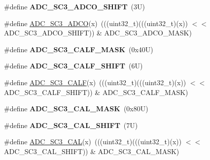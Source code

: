 \begin{DoxyCompactItemize}
\#define {\bfseries A\+D\+C\+\_\+\+S\+C3\+\_\+\+A\+D\+C\+O\+\_\+\+S\+H\+I\+FT}~(3\+U)
\item 
\#define \mbox{\hyperlink{group___a_d_c___register___masks_gaa0533bb7840bfc57b7f764013808b74d}{A\+D\+C\+\_\+\+S\+C3\+\_\+\+A\+D\+CO}}(x)~(((uint32\+\_\+t)(((uint32\+\_\+t)(x)) $<$$<$ A\+D\+C\+\_\+\+S\+C3\+\_\+\+A\+D\+C\+O\+\_\+\+S\+H\+I\+FT)) \& A\+D\+C\+\_\+\+S\+C3\+\_\+\+A\+D\+C\+O\+\_\+\+M\+A\+SK)
\item 
\mbox{\label{group___a_d_c___register___masks_ga3a706436447b6113727826e303c3fbe6}} 
\#define {\bfseries A\+D\+C\+\_\+\+S\+C3\+\_\+\+C\+A\+L\+F\+\_\+\+M\+A\+SK}~(0x40\+U)
\item 
\mbox{\label{group___a_d_c___register___masks_ga9fd60a35fc4c15b563078ecbd3eaa449}} 
\#define {\bfseries A\+D\+C\+\_\+\+S\+C3\+\_\+\+C\+A\+L\+F\+\_\+\+S\+H\+I\+FT}~(6\+U)
\item 
\#define \mbox{\hyperlink{group___a_d_c___register___masks_ga671f5531ad1accd17cbea2f319523a2d}{A\+D\+C\+\_\+\+S\+C3\+\_\+\+C\+A\+LF}}(x)~(((uint32\+\_\+t)(((uint32\+\_\+t)(x)) $<$$<$ A\+D\+C\+\_\+\+S\+C3\+\_\+\+C\+A\+L\+F\+\_\+\+S\+H\+I\+FT)) \& A\+D\+C\+\_\+\+S\+C3\+\_\+\+C\+A\+L\+F\+\_\+\+M\+A\+SK)
\item 
\mbox{\label{group___a_d_c___register___masks_ga0ec589c9101684eeac4af85452ed3673}} 
\#define {\bfseries A\+D\+C\+\_\+\+S\+C3\+\_\+\+C\+A\+L\+\_\+\+M\+A\+SK}~(0x80\+U)
\item 
\mbox{\label{group___a_d_c___register___masks_ga808101f85e6ceff194c212faacf4bd9d}} 
\#define {\bfseries A\+D\+C\+\_\+\+S\+C3\+\_\+\+C\+A\+L\+\_\+\+S\+H\+I\+FT}~(7\+U)
\item 
\#define \mbox{\hyperlink{group___a_d_c___register___masks_ga1bfd643a932720e0eba32688dca9c795}{A\+D\+C\+\_\+\+S\+C3\+\_\+\+C\+AL}}(x)~(((uint32\+\_\+t)(((uint32\+\_\+t)(x)) $<$$<$ A\+D\+C\+\_\+\+S\+C3\+\_\+\+C\+A\+L\+\_\+\+S\+H\+I\+FT)) \& A\+D\+C\+\_\+\+S\+C3\+\_\+\+C\+A\+L\+\_\+\+M\+A\+SK)
\end{DoxyCompactItemize}
